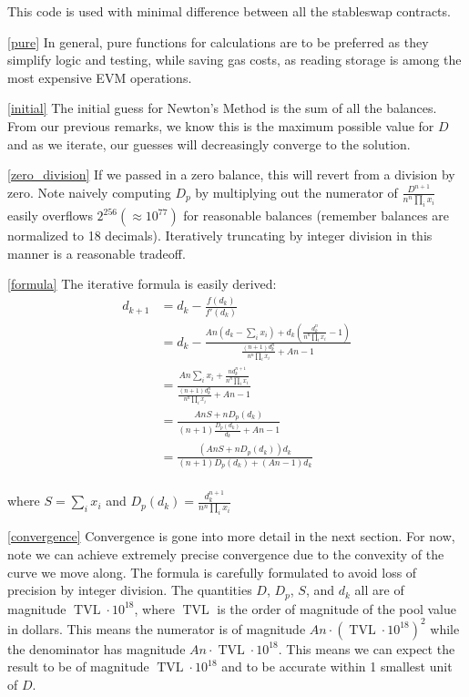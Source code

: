 \documentclass[
]{article}
\begin{document}
This code is used with minimal difference between all the stableswap
contracts.

\ref{pure} In general, pure functions for calculations are to be
preferred as they simplify logic and testing, while saving gas costs, as
reading storage is among the most expensive EVM operations.

\ref{initial} The initial guess for Newton's Method is the sum of all
the balances. From our previous remarks, we know this is the maximum
possible value for \(D\) and as we iterate, our guesses will
decreasingly converge to the solution.

\ref{zero_division} If we passed in a zero balance, this will revert
from a division by zero. Note naively computing \(D_p\) by multiplying
out the numerator of \(\frac{D^{n+1}}{n^n \prod_i x_i}\) easily
overflows \(2^{256} (\approx 10^{77})\) for reasonable balances
(remember balances are normalized to 18 decimals). Iteratively
truncating by integer division in this manner is a reasonable tradeoff.

\ref{formula} The iterative formula is easily derived: \[\begin{aligned}
d_{k+1} &= d_k - \frac{f(d_k)}{f'(d_k)} \\
&= d_k - \frac{A n (d_k - \sum_i x_i)  + d_k(\frac{d_k^{n}}{n^n \prod_i x_i} - 1)}{\frac{(n+1)d_k^n}{n^n \prod_i x_i} + An - 1} \\
&= \frac{An\sum_i x_i + \frac{nd_k^{n+1}}{n^n \prod_i x_i}}{\frac{(n+1)d_k^n}{n^n\prod_i x_i} + An - 1} \\
&= \frac{AnS + nD_p(d_k)}{(n+1)\frac{D_p(d_k)}{d_k} + An - 1} \\
&= \frac{(AnS + nD_p(d_k))d_k}{(n+1)D_p(d_k) + (An-1)d_k}\\
\end{aligned}\]

where \(S = \sum_i x_i\) and
\(D_p(d_k) = \frac{d_k^{n+1}}{n^n \prod_i x_i}\)

\ref{convergence} Convergence is gone into more detail in the next
section. For now, note we can achieve extremely precise convergence due
to the convexity of the curve we move along. The formula is carefully
formulated to avoid loss of precision by integer division. The
quantities \(D\), \(D_p\), \(S\), and \(d_k\) all are of magnitude
\(\operatorname{TVL} \cdot 10^{18}\), where \(\operatorname{TVL}\) is
the order of magnitude of the pool value in dollars. This means the
numerator is of magnitude
\(An\cdot (\operatorname{TVL}\cdot 10^{18})^2\) while the denominator
has magnitude \(An\cdot \operatorname{TVL}\cdot 10^{18}\). This means we
can expect the result to be of magnitude
\(\operatorname{TVL}\cdot 10^{18}\) and to be accurate within 1 smallest
unit of \(D\).
\end{document}
